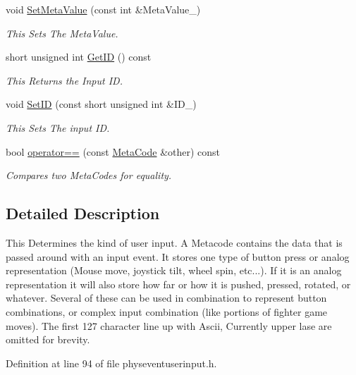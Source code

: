 \begin{DoxyCompactItemize}
void \hyperlink{classMetaCode_a1e410df95815b4d7e94b971bb1b8ba1e}{SetMetaValue} (const int \&MetaValue\_\-)
\begin{DoxyCompactList}\small\item\em This Sets The MetaValue. \item\end{DoxyCompactList}\item 
short unsigned int \hyperlink{classMetaCode_a680b5e1c2ce8d8d08d00f10187728547}{GetID} () const 
\begin{DoxyCompactList}\small\item\em This Returns the Input ID. \item\end{DoxyCompactList}\item 
void \hyperlink{classMetaCode_a0eb10030320a1fcfdda3b867b90e629f}{SetID} (const short unsigned int \&ID\_\-)
\begin{DoxyCompactList}\small\item\em This Sets The input ID. \item\end{DoxyCompactList}\item 
bool \hyperlink{classMetaCode_a296b774682a9326494e0c2d1b357ec2a}{operator==} (const \hyperlink{classMetaCode}{MetaCode} \&other) const 
\begin{DoxyCompactList}\small\item\em Compares two MetaCodes for equality. \item\end{DoxyCompactList}\end{DoxyCompactItemize}


\subsection{Detailed Description}
This Determines the kind of user input. A Metacode contains the data that is passed around with an input event. It stores one type of button press or analog representation (Mouse move, joystick tilt, wheel spin, etc...). If it is an analog representation it will also store how far or how it is pushed, pressed, rotated, or whatever. Several of these can be used in combination to represent button combinations, or complex input combination (like portions of fighter game moves). The first 127 character line up with Ascii, Currently upper lase are omitted for brevity. 

Definition at line 94 of file physeventuserinput.h.

